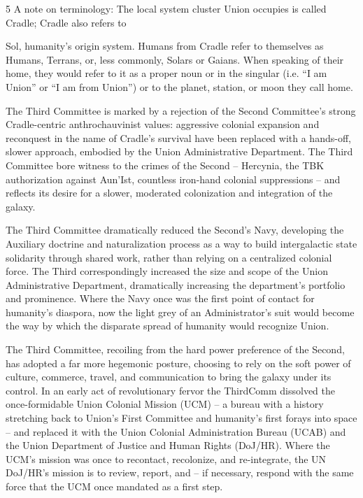 5 A note on terminology: The local system cluster Union occupies is called Cradle; Cradle also refers to

Sol, humanity’s origin system. Humans from Cradle refer to themselves as Humans, Terrans, or, less
commonly, Solars or Gaians. When speaking of their home, they would refer to it as a proper noun or in the
singular (i.e. “I am Union” or “I am from Union”) or to the planet, station, or moon they call home.




The Third Committee is marked by a rejection of the Second Committee’s strong Cradle-centric
anthrochauvinist values: aggressive colonial expansion and reconquest in the name of Cradle’s
survival have been replaced with a hands-off, slower approach, embodied by the Union
Administrative Department. The Third Committee bore witness to the crimes of the Second --
Hercynia, the TBK authorization against Aun’Ist, countless iron-hand colonial suppressions -- and
reflects its desire for a slower, moderated colonization and integration of the galaxy.

The Third Committee dramatically reduced the Second’s Navy, developing the Auxiliary doctrine
and naturalization process as a way to build intergalactic state solidarity through shared work,
rather than relying on a centralized colonial force. The Third correspondingly increased the size
and scope of the Union Administrative Department, dramatically increasing the department’s
portfolio and prominence. Where the Navy once was the first point of contact for humanity’s
diaspora, now the light grey of an Administrator’s suit would become the way by which the
disparate spread of humanity would recognize Union.

The Third Committee, recoiling from the hard power preference of the Second, has adopted a far
more hegemonic posture, choosing to rely on the soft power of culture, commerce, travel, and
communication to bring the galaxy under its control. In an early act of revolutionary fervor the
ThirdComm dissolved the once-formidable Union Colonial Mission (UCM) -- a bureau with a
history stretching back to Union’s First Committee and humanity’s first forays into space -- and
replaced it with the Union Colonial Administration Bureau (UCAB) and the Union Department of
Justice and Human Rights (DoJ/HR). Where the UCM’s mission was once to recontact,
recolonize, and re-integrate, the UN DoJ/HR’s mission is to review, report, and -- if necessary,
respond with the same force that the UCM once mandated as a first step.

